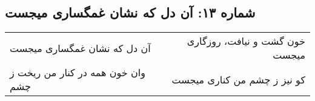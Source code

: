 \begin{center}
\section*{شماره ۱۳: آن دل که نشان غمگساری میجست}
\label{sec:013}
\begin{longtable}{l p{0.5cm} r}
آن دل که نشان غمگساری میجست
&&
خون گشت و نیافت، روزگاری میجست
\\
وان خون همه در کنار من ریخت ز چشم
&&
کو نیز ز چشم من کناری میجست
\\
\end{longtable}
\end{center}

